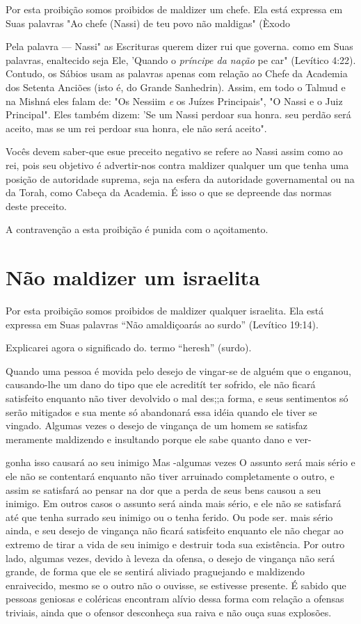 Por esta proibição somos proibidos de maldizer um chefe. Ela está
expressa em Suas palavras "Ao chefe (Nassi) de teu povo não maldigas"
(Èxodo

Pela palavra --- Nassi" as Escrituras querem dizer rui
que governa. como em Suas palavras, enaltecido seja Ele, 'Quando o
\emph{príncipe da nação} pe car" (Levítico 4:22). Contudo, os Sábios
usam as palavras apenas com relação ao Chefe da Academia dos Setenta
Anciões (isto é, do Grande Sanhedrin). As­sim, em todo o Talmud e na
Mishná eles falam de: "Os Nessiim \emph{e} os Juízes Prin­cipais", "O
Nassi e o Juiz Principal". Eles também dizem: 'Se um Nassi per­doar sua
honra. seu perdão será aceito, mas se um rei perdoar sua honra, ele não
será aceito".

Vocês devem saber-que esue preceito negativo se refere ao Nassi as­sim
como ao rei, pois seu objetivo é advertir-nos contra maldizer qualquer
um que tenha uma posição de autoridade suprema, seja na esfera da
autoridade go­vernamental ou na da Torah, como Cabeça da Academia. É
isso o que se de­preende das normas deste preceito.

A contravenção a esta proibição é punida com o açoitamento.

\section{Não maldizer um israelita}

Por esta proibição somos proibidos de maldizer qualquer israelita. Ela
está expressa em Suas palavras ``Não amaldiçoarás ao surdo'' (Levítico
19:14).

Explicarei agora o significado do. termo ``heresh'' (surdo).

Quando uma pessoa é movida pelo desejo de vingar-se de alguém que o
enganou, causando-lhe um dano do tipo que ele acreditít ter sofrido, ele
não ficará satisfeito enquanto não tiver devolvido o mal des;;a forma, e
seus sentimentos só serão mitigados e sua mente só abandonará essa idéia
quando ele tiver se vingado. Algumas vezes o desejo de vingança de um
homem se sa­tisfaz meramente maldizendo e insultando porque ele sabe
quanto dano e ver-


gonha isso causará ao seu inimigo Mas -algumas vezes O assunto será mais
sério e ele não se contentará enquanto não tiver arruinado completamente
o outro, e assim se satisfará ao pensar na dor que a perda de seus bens
causou a seu inimigo. Em outros casos o assunto será ainda mais sério, e
ele não se satisfará até que tenha surrado seu inimigo ou o tenha
ferido. Ou pode ser. mais sério ainda, e seu desejo de
vingança não ficará satisfeito enquanto ele não chegar ao extremo de
tirar a vida de seu inimigo e destruir toda sua existência. Por outro
lado, algumas vezes, devido à leveza da ofensa, o desejo de vingança não
será grande, de forma que ele se sentirá aliviado praguejando e
maldizendo enraivecido, mesmo se o outro não o ouvisse, se estivesse
pre­sente. É sabido que pessoas geniosas e coléricas encontram alívio
dessa forma com relação a ofensas triviais, ainda que o ofensor
desconheça sua raiva e não ouça suas explosões.

